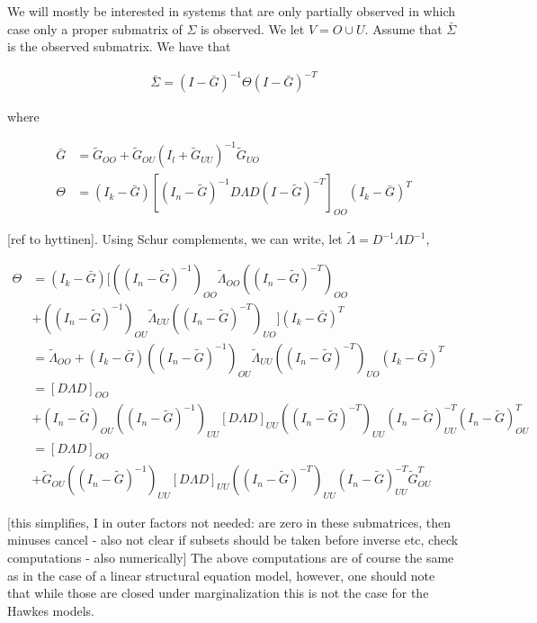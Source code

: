 \documentclass[accepted]{uai2021} %
\begin{document}
We will mostly be interested in systems that are only partially observed in 
which case only a proper submatrix of $\Sigma$ is observed. We let $V = O \cup 
U$. Assume that $\bar{\Sigma}$ is the observed submatrix. We have 
that 

\begin{align}
\bar{\Sigma} = (I - \bar{G})^{-1}\Theta(I - \bar{G})^{-T}
\end{align}

where 

\begin{align*}
\bar{G} & = \tilde{G}_{OO} +  \tilde{G}_{OU}(I_l + 
\tilde{G}_{UU})^{-1}\tilde{G}_{UO} \\
\Theta & = (I_k-\bar{G})[(I_n - \tilde{G})^{-1}D\Lambda D(I - 
\tilde{G})^{-T}]_{OO}(I_k-\bar{G})^T
\end{align*}

[ref to hyttinen]. Using Schur complements, we can write, let $\tilde{\Lambda} 
= D^{-1}\Lambda D^{-1}$,

\begin{align*}
\Theta & = (I_k - \bar{G})[((I_n - 
\tilde{G})^{-1})_{OO}\tilde{\Lambda}_{OO}((I_n - \tilde{G})^{-T})_{OO} \\ & + 
((I_n 
- 
\tilde{G})^{-1})_{OU}\tilde{\Lambda}_{UU}((I_n - \tilde{G})^{-T})_{UO}](I_k - 
\bar{G})^T \\
& = \tilde{\Lambda}_{OO} + (I_k - \bar{G})((I_n 
- 
\tilde{G})^{-1})_{OU}\tilde{\Lambda}_{UU}((I_n - \tilde{G})^{-T})_{UO}(I_k - 
\bar{G})^T \\
& = [D\Lambda D]_{OO} \\ & + (I_n - \tilde{G})_{OU}((I_n - 
\tilde{G})^{-1})_{UU}[D\Lambda D]_{UU}((I_n - \tilde{G})^{-T})_{UU}(I_n - 
\tilde{G})_{UU}^{-T}(I_n - 
\tilde{G})_{OU}^T \\
& = [D\Lambda D]_{OO} \\ & + \tilde{G}_{OU}((I_n - 
\tilde{G})^{-1})_{UU}[D\Lambda D]_{UU}((I_n - \tilde{G})^{-T})_{UU}(I_n - 
\tilde{G})_{UU}^{-T} 
\tilde{G}_{OU}^T
\end{align*}

[this simplifies, I in outer factors not needed: are zero in these submatrices, 
then minuses cancel - also not clear if subsets should be taken before inverse 
etc, check computations - also numerically]
The above computations are of course the same as in the case of a linear 
structural equation model, however, one should note that while those are closed 
under marginalization this is not the case for the Hawkes models.
\end{document}
